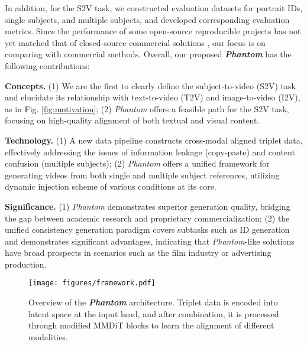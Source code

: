 In addition, for the S2V task, we constructed evaluation datasets for portrait IDs, single subjects, and multiple subjects, and developed corresponding evaluation metrics. Since the performance of some open-source reproducible projects \cite{he2024id, yuan2024identity, huang2025conceptmaster, liang2025movie, chen2025multi} has not yet matched that of closed-source commercial solutions \cite{Vidu, Pika, Keling, Hailuo, polyak2024movie}, our focus is on comparing with commercial methods. Overall, our proposed \textbf{\textit{Phantom}} has the following contributions:

\textbf{Concepts.} (1) We are the first to clearly define the subject-to-video (S2V) task and elucidate its relationship with text-to-video (T2V) and image-to-video (I2V), as in Fig. \ref{fig:motivation}; (2) \textit{Phantom} offers a feasible path for the S2V task, focusing on high-quality alignment of both textual and visual content.

\textbf{Technology.} (1) A new data pipeline constructs cross-modal aligned triplet data, effectively addressing the issues of information leakage (copy-paste) and content confusion (multiple subjects); (2) \textit{Phantom} offers a unified framework for generating videos from both single and multiple subject references, utilizing dynamic injection scheme of various conditions at its core.

\textbf{Significance.} (1) \textit{Phantom} demonstrates superior generation quality, bridging the gap between academic research and proprietary commercialization; (2) the unified consistency generation paradigm covers subtasks such as ID generation and demonstrates significant advantages, indicating that \textit{Phantom}-like solutions have broad prospects in scenarios such as the film industry or advertising production.


\begin{figure*}[t]
	\centering
	\texttt{[image: figures/framework.pdf]} 
	\caption{Overview of the \textbf{\textit{Phantom}} architecture. Triplet data is encoded into latent space at the input head, and after combination, it is processed through modified MMDiT blocks to learn the alignment of different modalities. }
	\label{fig:framework}
\end{figure*}

